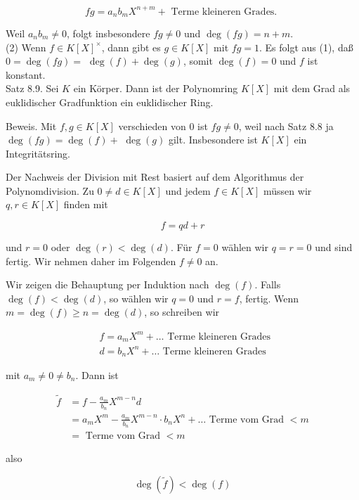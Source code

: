 \documentclass[10pt, letterpaper]{article}
\begin{document}
$$
f g=a_{n} b_{m} X^{n+m}+\text { Terme kleineren Grades. }
$$

Weil $a_{n} b_{m} \neq 0$, folgt insbesondere $f g \neq 0$ und $\operatorname{deg}(f g)=n+m$.\\
(2) Wenn $f \in K[X]^{\times}$, dann gibt es $g \in K[X]$ mit $f g=1$. Es folgt aus (1), daß $0=\operatorname{deg}(f g)=$ $\operatorname{deg}(f)+\operatorname{deg}(g)$, somit $\operatorname{deg}(f)=0$ und $f$ ist konstant.\\
Satz 8.9. Sei $K$ ein Körper. Dann ist der Polynomring $K[X]$ mit dem Grad als euklidischer Gradfunktion ein euklidischer Ring.

Beweis. Mit $f, g \in K[X]$ verschieden von 0 ist $f g \neq 0$, weil nach Satz 8.8 ja $\operatorname{deg}(f g)=\operatorname{deg}(f)+$ $\operatorname{deg}(g)$ gilt. Insbesondere ist $K[X]$ ein Integritätsring.

Der Nachweis der Division mit Rest basiert auf dem Algorithmus der Polynomdivision. Zu $0 \neq d \in K[X]$ und jedem $f \in K[X]$ müssen wir $q, r \in K[X]$ finden mit

$$
f=q d+r
$$

und $r=0$ oder $\operatorname{deg}(r)<\operatorname{deg}(d)$. Für $f=0$ wählen wir $q=r=0$ und sind fertig. Wir nehmen daher im Folgenden $f \neq 0$ an.

Wir zeigen die Behauptung per Induktion nach $\operatorname{deg}(f)$. Falls $\operatorname{deg}(f)<\operatorname{deg}(d)$, so wählen wir $q=0$ und $r=f$, fertig. Wenn $m=\operatorname{deg}(f) \geq n=\operatorname{deg}(d)$, so schreiben wir

$$
\begin{aligned}
& f=a_{m} X^{m}+\ldots \text { Terme kleineren Grades } \\
& d=b_{n} X^{n}+\ldots \text { Terme kleineren Grades }
\end{aligned}
$$

mit $a_{m} \neq 0 \neq b_{n}$. Dann ist

$$
\begin{aligned}
\tilde{f} & =f-\frac{a_{m}}{b_{n}} X^{m-n} d \\
& =a_{m} X^{m}-\frac{a_{m}}{b_{n}} X^{m-n} \cdot b_{n} X^{n}+\ldots \text { Terme vom Grad }<m \\
& =\text { Terme vom Grad }<m
\end{aligned}
$$

also

$$
\operatorname{deg}(\tilde{f})<\operatorname{deg}(f)
$$
\end{document}
